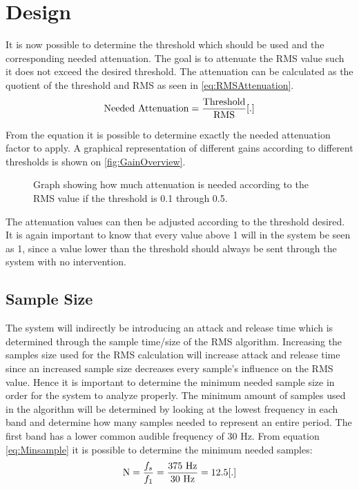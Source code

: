 \section{Design}
It is now possible to determine the threshold which should be used and the corresponding needed attenuation. The goal is to attenuate the RMS value such it does not exceed the desired threshold. The attenuation can be calculated as the quotient of the threshold and RMS as seen in \autoref{eq:RMSAttenuation}.
\begin{equation}\label{eq:RMSAttenuation}
\text{Needed Attenuation} = \frac{\text{Threshold}}{\text{RMS}} \enhed{.}
\end{equation}

From the equation it is possible to determine exactly the needed attenuation factor to apply. A graphical representation of different gains according to different thresholds is shown on \autoref{fig:GainOverview}.

\begin{figure}[H]
\centering
{}

\caption{Graph showing how much attenuation is needed according to the RMS value if the threshold is 0.1 through 0.5.}
\label{fig:GainOverview}
\end{figure}

The attenuation values can then be adjusted according to the threshold desired. It is again important to know that every value above 1 will in the system be seen as 1, since a value lower than the threshold should always be sent through the system with no intervention.  


\subsection*{Sample Size}
The system will indirectly be introducing an attack and release time which is determined through the sample time/size of the RMS algorithm. Increasing the samples size used for the RMS calculation will increase attack and release time since an increased sample size decreases every sample's influence on the RMS value. Hence it is important to determine the minimum needed sample size in order for the system to analyze properly. The minimum amount of samples used in the algorithm will be determined by looking at the lowest frequency in each band and determine how many samples needed to represent an entire period. The first band has a lower common audible frequency of 30 Hz. From equation \ref{eq:Minsample} it is possible to determine the minimum needed samples:
\begin{equation}\label{eq:Minsample}
\text{N} = \frac{f_s}{f_1} = \frac{375 \text{ Hz}}{30 \text{ Hz}} = 12.5 \enhed{.}
\end{equation} 
\begin{where}
\end{where} 

